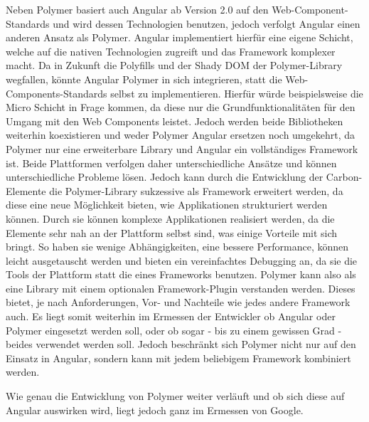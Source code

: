 Neben Polymer basiert auch Angular ab Version 2.0 auf den Web-Component-Standards und wird dessen Technologien benutzen, jedoch verfolgt Angular einen anderen Ansatz als Polymer. Angular implementiert hierfür eine eigene Schicht, welche auf die nativen Technologien zugreift und das Framework komplexer macht. Da in Zukunft die Polyfills und der Shady \ac{DOM} der Polymer-Library wegfallen, könnte Angular Polymer in sich integrieren, statt die Web-Components-Standards selbst zu implementieren. Hierfür würde beispielsweise die Micro Schicht in Frage kommen, da diese nur die Grundfunktionalitäten für den Umgang mit den Web Components leistet. Jedoch werden beide Bibliotheken weiterhin koexistieren und weder Polymer Angular ersetzen noch umgekehrt, da Polymer nur eine erweiterbare Library und Angular ein vollständiges Framework ist. Beide Plattformen verfolgen daher unterschiedliche Ansätze und können unterschiedliche Probleme lösen. Jedoch kann durch die Entwicklung der Carbon-Elemente die Polymer-Library sukzessive als Framework erweitert werden, da diese eine neue Möglichkeit bieten, wie Applikationen strukturiert werden können. Durch sie können komplexe Applikationen realisiert werden, da die Elemente sehr nah an der Plattform selbst sind, was einige Vorteile mit sich bringt. So haben sie wenige Abhängigkeiten, eine bessere Performance, können leicht ausgetauscht werden und bieten ein vereinfachtes Debugging an, da sie die Tools der Plattform statt die eines Frameworks benutzen. Polymer kann also als eine Library mit einem optionalen Framework-Plugin verstanden werden. Dieses bietet, je nach Anforderungen, Vor- und Nachteile wie jedes andere Framework auch. Es liegt somit weiterhin im Ermessen der Entwickler ob Angular oder Polymer eingesetzt werden soll, oder ob sogar - bis zu einem gewissen Grad - beides verwendet werden soll. Jedoch beschränkt sich Polymer nicht nur auf den Einsatz in Angular, sondern kann mit jedem beliebigem Framework kombiniert werden.

Wie genau die Entwicklung von Polymer weiter verläuft und ob sich diese auf Angular auswirken wird, liegt jedoch ganz im Ermessen von Google.

